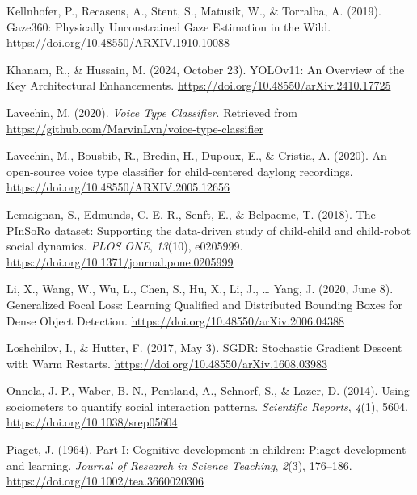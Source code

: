 \documentclass[
  man,floatsintext]{apa6}
\newlength{\cslhangindent}
\newenvironment{CSLReferences}[2] %
 {\begin{list}{}{%
  \setlength{\itemindent}{0pt}
  \setlength{\leftmargin}{0pt}
  \setlength{\parsep}{0pt}
  \ifodd #1
   \setlength{\leftmargin}{\cslhangindent}
   \setlength{\itemindent}{-1\cslhangindent}
  \fi
  \setlength{\itemsep}{#2\baselineskip}}}
 {\end{list}}
\begin{document}
\begin{CSLReferences}{1}{0}
Kellnhofer, P., Recasens, A., Stent, S., Matusik, W., \& Torralba, A. (2019). Gaze360: {Physically Unconstrained Gaze Estimation} in the {Wild}. \url{https://doi.org/10.48550/ARXIV.1910.10088}

Khanam, R., \& Hussain, M. (2024, October 23). {YOLOv11}: {An Overview} of the {Key Architectural Enhancements}. \url{https://doi.org/10.48550/arXiv.2410.17725}

Lavechin, M. (2020). \emph{Voice {Type Classifier}}. Retrieved from \url{https://github.com/MarvinLvn/voice-type-classifier}

Lavechin, M., Bousbib, R., Bredin, H., Dupoux, E., \& Cristia, A. (2020). An open-source voice type classifier for child-centered daylong recordings. \url{https://doi.org/10.48550/ARXIV.2005.12656}

Lemaignan, S., Edmunds, C. E. R., Senft, E., \& Belpaeme, T. (2018). The {PInSoRo} dataset: {Supporting} the data-driven study of child-child and child-robot social dynamics. \emph{PLOS ONE}, \emph{13}(10), e0205999. \url{https://doi.org/10.1371/journal.pone.0205999}

Li, X., Wang, W., Wu, L., Chen, S., Hu, X., Li, J., \ldots{} Yang, J. (2020, June 8). Generalized {Focal Loss}: {Learning Qualified} and {Distributed Bounding Boxes} for {Dense Object Detection}. \url{https://doi.org/10.48550/arXiv.2006.04388}

Loshchilov, I., \& Hutter, F. (2017, May 3). {SGDR}: {Stochastic Gradient Descent} with {Warm Restarts}. \url{https://doi.org/10.48550/arXiv.1608.03983}

Onnela, J.-P., Waber, B. N., Pentland, A., Schnorf, S., \& Lazer, D. (2014). Using sociometers to quantify social interaction patterns. \emph{Scientific Reports}, \emph{4}(1), 5604. \url{https://doi.org/10.1038/srep05604}

Piaget, J. (1964). Part {I}: {Cognitive} development in children: {Piaget} development and learning. \emph{Journal of Research in Science Teaching}, \emph{2}(3), 176--186. \url{https://doi.org/10.1002/tea.3660020306}


\end{CSLReferences}
\end{document}
